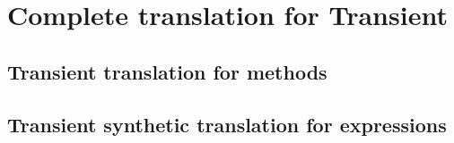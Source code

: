 \documentclass[a4paper,USenglish]{tex/lipics-v2016}
\begin{document}
\begin{mathpar}




\end{mathpar}

\section{Complete translation for Transient}

\subsection{Transient translation for methods}



\begin{mathpar}

\end{mathpar}

\subsection{Transient synthetic translation for expressions}

\end{document}

